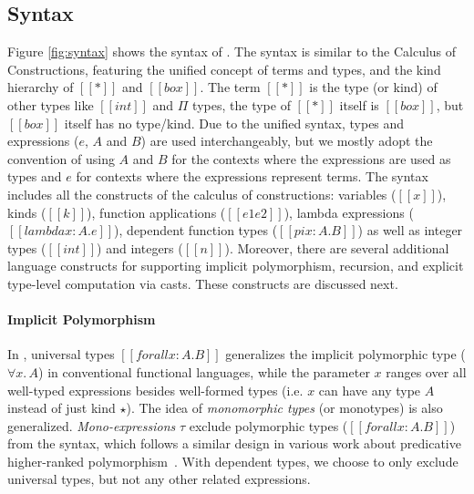 \subsection{Syntax}

Figure \ref{fig:syntax} shows the syntax of \name. The syntax is similar
to the Calculus of Constructions, featuring the unified concept of terms and types,
and the kind hierarchy of $[[*]]$ and $[[box]]$.
The term $[[*]]$ is the type (or kind) of other types like $[[int]]$ and $\Pi$ types,
the type of $[[*]]$ itself is $[[box]]$, but $[[box]]$ itself has no type/kind.
Due to the unified syntax, types and
expressions ($e$, $A$ and $B$) are used
interchangeably, but we mostly adopt the convention of using $A$ and $B$
for the contexts where the expressions are used as types and $e$ for contexts
where the expressions represent terms.
The syntax includes all the constructs of the calculus of constructions:
variables ($[[x]]$), kinds ($[[k]]$), function applications  ($[[e1 e2]]$),
lambda expressions ($[[lambda x : A. e]]$), dependent function types ($[[pi x : A. B]]$)
as well as integer types ($[[int]]$) and integers ($[[n]]$).
Moreover, there are several additional language constructs for
supporting implicit polymorphism, recursion, and explicit type-level computation
via casts. These constructs are discussed next.

\paragraph{Implicit Polymorphism}
In \name, universal types $[[forall x : A. B]]$ generalizes the implicit
polymorphic type ($\forall x.\, A$) in conventional functional languages,
while the parameter $x$ ranges over all well-typed expressions besides well-formed
types (i.e. $x$ can have any type $A$ instead of just kind $\star$). The idea of
\emph{monomorphic types} (or monotypes) is also generalized.
\emph{Mono-expressions} $\tau$ exclude polymorphic types ($[[forall x : A. B]]$) from the syntax,
which follows a similar design in various work about predicative
higher-ranked polymorphism~\cite{odersky1996putting,dunfield2013complete,jones2007practical}.
With dependent types, we choose to only exclude universal types, but not
any other related expressions.

